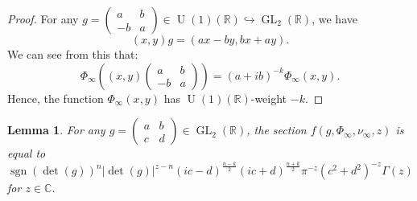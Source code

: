 \documentclass[11pt, a4paper]{amsart}
\theoremstyle{plain}
\newtheorem{lemma}[theorem]{Lemma}
\theoremstyle{definition}
\numberwithin{equation}{section}
\def\CC{\mathbb{C}}
\def\RR{\mathbb{R}}
\DeclareMathOperator{\sgn}{sgn}
\DeclareMathOperator{\GL}{\mathrm{GL}}
\DeclareMathOperator{\U}{\mathrm{U}}
\begin{document}
\begin{proof}
    For any $g = \begin{pmatrix}
                    a & b \\
                    -b & a 
                  \end{pmatrix} \in \U(1)(\RR) \hookrightarrow \GL_2(\RR)$, 
    we have 
    \begin{equation*}
        (x, y) g = (ax - by, bx + ay). 
    \end{equation*}
    We can see from this that: 
    \begin{equation*}
        \Phi_{\infty}((x, y) \begin{pmatrix}
                                a & b \\
                                -b & a
                             \end{pmatrix}) = (a + ib)^{-k} \Phi_{\infty}(x, y). 
    \end{equation*}
    Hence, the function $\Phi_{\infty}(x, y)$ has $\U(1)(\RR)$-weight $-k$. 
\end{proof}

\begin{lemma}
\label{Lemma: arch f formula}
    For any $g = \begin{pmatrix}
                    a & b \\
                    c & d 
                \end{pmatrix} \in \GL_2(\RR)$, the section $f(g, \Phi_{\infty}, \nu_{\infty}, z)$ is equal to 
    \begin{equation*}
        \sgn(\det(g))^{n}|\det(g)|^{z - n} (ic - d)^{\frac{n - k}{2}}(ic + d)^{\frac{n + k}{2}}\pi^{-z}(c^2 + d^2)^{-z} \Gamma(z)
    \end{equation*}
    for $z \in \CC$. 
\end{lemma}
\end{document}
